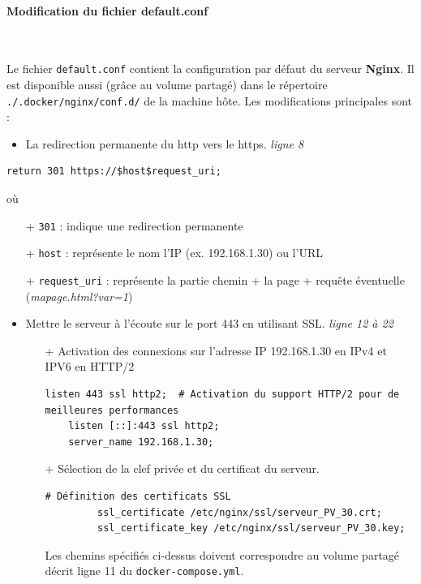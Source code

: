 \documentclass[french, 12pt]{article}%
\newcommand{\itemE}{\item[$\bullet$]}
\begin{document}
\paragraph{Modification du fichier default.conf} \ 

Le fichier \verb?default.conf? contient la configuration par défaut du serveur \textbf{Nginx}. Il est disponible aussi (grâce au volume partagé) dans le répertoire \verb?./.docker/nginx/conf.d/? de la machine hôte.  Les modifications principales sont : 

\begin{itemize}
\itemE La redirection permanente du http vers le https. \textit{ligne 8}
\end{itemize}

\begin{lstlisting}[style=commande]
    return 301 https://$host$request_uri;
\end{lstlisting}
où 
\begin{itemize}
\item[+] \verb?301? : indique une redirection permanente
\item[+] \verb?host? : représente le nom l'IP  (ex. 192.168.1.30) ou l'URL
\item[+]  \verb?request_uri? : représente la partie chemin + la page + requête éventuelle (\textit{mapage.html?var=1})
\end{itemize}

\begin{itemize}
\itemE Mettre le serveur à l'écoute sur le port 443 en utilisant SSL. \textit{ligne 12 à 22}

	\begin{itemize}
	\item[+] Activation des connexions sur l'adresse IP 192.168.1.30 en IPv4 et IPV6 en HTTP/2 
	
	\begin{lstlisting}[style=commande]
	listen 443 ssl http2;  # Activation du support HTTP/2 pour de meilleures performances
	listen [::]:443 ssl http2;	
	server_name 192.168.1.30;
	\end{lstlisting}
	\end{itemize}

	\begin{itemize}
	\item[+] Sélection de la clef privée et du certificat du serveur. 
	
	\begin{lstlisting}[style=commande]
	    # Définition des certificats SSL                                                                                           
         ssl_certificate /etc/nginx/ssl/serveur_PV_30.crt;
         ssl_certificate_key /etc/nginx/ssl/serveur_PV_30.key;
	\end{lstlisting}
	Les chemins spécifiés ci-dessus doivent correspondre au volume partagé  décrit ligne 11 du \verb?docker-compose.yml?.
	\end{itemize}

\end{itemize}
\end{document}
